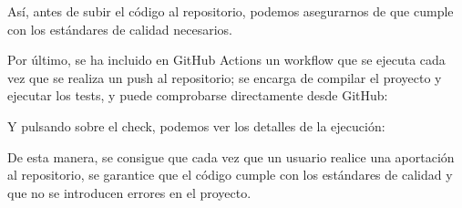 Así, antes de subir el código al repositorio, podemos asegurarnos de que cumple con los estándares de calidad necesarios.

Por último, se ha incluido en GitHub Actions un workflow que se ejecuta cada vez que se realiza un push al repositorio;
se encarga de compilar el proyecto y ejecutar los tests, y puede comprobarse directamente desde GitHub:


Y pulsando sobre el check, podemos ver los detalles de la ejecución:


De esta manera, se consigue que cada vez que un usuario realice una aportación al repositorio, se garantice que el código
cumple con los estándares de calidad y que no se introducen errores en el proyecto.